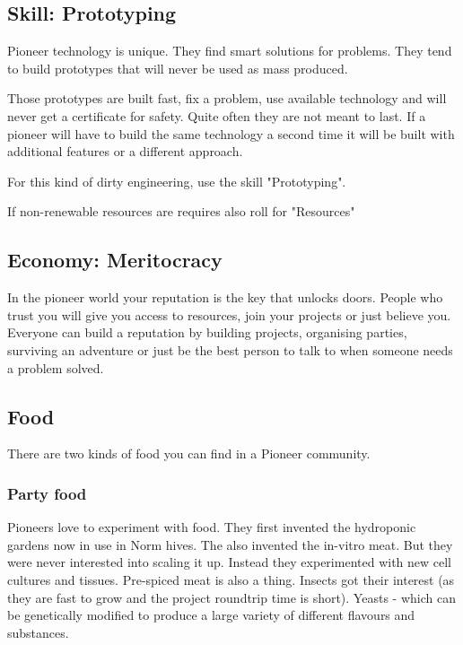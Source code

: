 \subsection{Skill: Prototyping}
\label{sec:Prototyping skill}

Pioneer technology is unique. They find smart solutions for problems. They tend to build prototypes that will never be used as mass produced.

Those prototypes are built fast, fix a problem, use available technology and will never get a certificate for safety.
Quite often they are not meant to last.
If a pioneer will have to build the same technology a second time it will be built with additional features or a different approach.

For this kind of dirty engineering, use the skill "Prototyping".

If non-renewable resources are requires also roll for "Resources"

\subsection{Economy: Meritocracy}
\label{sec:meritocracy}

In the pioneer world your reputation is the key that unlocks doors. People who trust you will give you access to resources, join your projects or just believe you.
Everyone can build a reputation by building projects, organising parties, surviving an adventure or just be the best person to talk to when someone needs a problem solved.

\subsection{Food}
\label{sec: pioneer food}

There are two kinds of food you can find in a Pioneer community.

\subsubsection{Party food}

Pioneers love to experiment with food. They first invented the hydroponic gardens now in use in Norm hives. The also invented the in-vitro meat. But they were never interested into scaling it up. Instead they experimented with new cell cultures and tissues. Pre-spiced meat is also a thing.
Insects got their interest (as they are fast to grow and the project roundtrip time is short). Yeasts - which can be genetically modified to produce a large variety of different flavours and substances.

